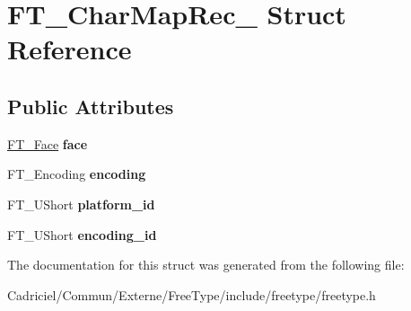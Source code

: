 \hypertarget{struct_f_t___char_map_rec__}{}\section{F\+T\+\_\+\+Char\+Map\+Rec\+\_\+ Struct Reference}
\label{struct_f_t___char_map_rec__}
\subsection*{Public Attributes}
\begin{DoxyCompactItemize}
\item 
\hyperlink{struct_f_t___face_rec__}{F\+T\+\_\+\+Face} {\bfseries face}\hypertarget{struct_f_t___char_map_rec___a70a4e53e3f9818209916e5745c46dc28}{}\label{struct_f_t___char_map_rec___a70a4e53e3f9818209916e5745c46dc28}

\item 
F\+T\+\_\+\+Encoding {\bfseries encoding}\hypertarget{struct_f_t___char_map_rec___a88ee6f726ef11a8e6cc793d59ff5557e}{}\label{struct_f_t___char_map_rec___a88ee6f726ef11a8e6cc793d59ff5557e}

\item 
F\+T\+\_\+\+U\+Short {\bfseries platform\+\_\+id}\hypertarget{struct_f_t___char_map_rec___ae7f439996a8615698e780ce3c4f92457}{}\label{struct_f_t___char_map_rec___ae7f439996a8615698e780ce3c4f92457}

\item 
F\+T\+\_\+\+U\+Short {\bfseries encoding\+\_\+id}\hypertarget{struct_f_t___char_map_rec___af10dd43eee8dc93e7d6191c663ae831a}{}\label{struct_f_t___char_map_rec___af10dd43eee8dc93e7d6191c663ae831a}

\end{DoxyCompactItemize}


The documentation for this struct was generated from the following file\+:\begin{DoxyCompactItemize}
\item 
Cadriciel/\+Commun/\+Externe/\+Free\+Type/include/freetype/freetype.\+h\end{DoxyCompactItemize}

